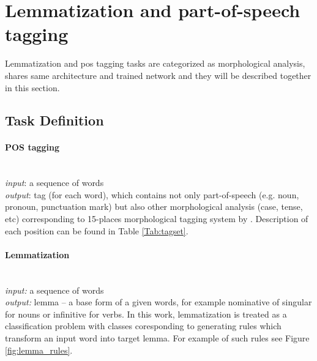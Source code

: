 \section{Lemmatization and part-of-speech tagging}
\label{chap:tag}
Lemmatization and \acrlong{pos} tagging tasks are categorized as morphological analysis, shares same architecture and trained network and they will be described together in this section.
\subsection{Task Definition}

\paragraph{\textbf{POS tagging}} \mbox{}\\
\textit{input}: a sequence of  words \\
\textit{output}: tag (for each word), which contains not only part-of-speech (e.g. noun, pronoun, punctuation mark) but also other morphological analysis (case, tense, etc) corresponding to 15-places morphological tagging system by \cite{Hajic2004}. Description of each position can be found in Table \ref{Tab:tagset}. %

\paragraph{\textbf{Lemmatization}} \mbox{}\\
\textit{input:} a sequence of words \\
\textit{output:} lemma -- a base form of a given words, for example nominative of singular for nouns or infinitive for verbs. In this work, lemmatization is treated as a classification problem with classes coresponding to generating rules which transform an input word into target lemma. For example of such rules see Figure \ref{fig:lemma_rules}. \\ %


